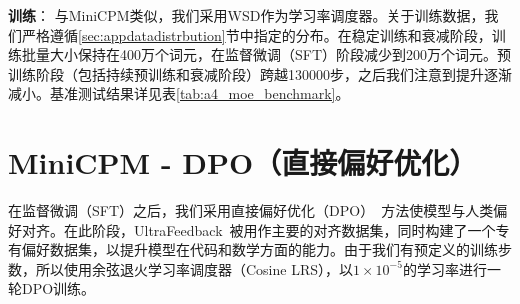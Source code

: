 \textbf{训练}：
与MiniCPM类似，我们采用WSD作为学习率调度器。关于训练数据，我们严格遵循\ref{sec:appdatadistrbution}节中指定的分布。在稳定训练和衰减阶段，训练批量大小保持在400万个词元，在监督微调（SFT）阶段减少到200万个词元。预训练阶段（包括持续预训练和衰减阶段）跨越130000步，之后我们注意到提升逐渐减小。基准测试结果详见表\ref{tab:a4_moe_benchmark}。

\begin{table}[htbp]
    \centering
{}
    \caption{MiniCPM - MoE的基准测试结果。$^\dag$表示MBPP的评估结果基于完整数据集，而非人工验证集~\citep{austin2021program}。Llama2 - 34B和Qwen1.5 - 7B的评估结果取自其技术报告。}
    \label{tab:a4_moe_benchmark}

\end{table}

\section{MiniCPM - DPO（直接偏好优化）}
\label{app:rlhf}
在监督微调（SFT）之后，我们采用直接偏好优化（DPO）~\citep{rafailov2024direct}方法使模型与人类偏好对齐。在此阶段，UltraFeedback~\citep{cui2023ultrafeedback}被用作主要的对齐数据集，同时构建了一个专有偏好数据集，以提升模型在代码和数学方面的能力。由于我们有预定义的训练步数，所以使用余弦退火学习率调度器（Cosine LRS），以$1\times 10^{-5}$的学习率进行一轮DPO训练。

